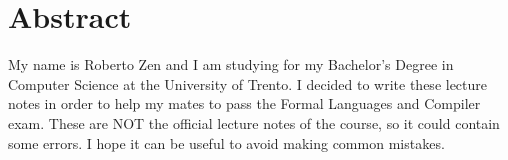 \chapter*{Abstract}
My name is Roberto Zen and I am studying for my Bachelor’s Degree in Computer Science at the University of Trento. I decided to write these lecture notes in order to help my mates to pass the Formal Languages and Compiler exam. These are NOT the official lecture notes of the course, so it could contain some errors. I hope it can be useful to avoid making common mistakes.
